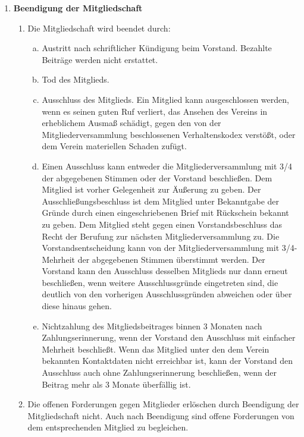 \documentclass{article}
\begin{document}
\begin{enumerate}[§ 1.]
\item \textsf{\textbf{Beendigung der Mitgliedschaft}}
	\begin{enumerate}[1.]
	\item Die Mitgliedschaft wird beendet durch:
		\begin{enumerate}[a.]
		\item Austritt nach schriftlicher Kündigung beim Vorstand. Bezahlte
Beiträge werden nicht erstattet.
		\item Tod des Mitglieds.
		\item Ausschluss des Mitglieds. Ein Mitglied kann ausgeschlossen werden, wenn es seinen guten Ruf verliert, das Ansehen des Vereins in erheblichem Ausmaß schädigt, gegen den von der Mitgliederversammlung beschlossenen Verhaltenskodex verstößt, oder dem Verein materiellen Schaden zufügt.
		\item Einen Ausschluss kann entweder die Mitgliederversammlung mit 3/4 der abgegebenen Stimmen oder  der Vorstand beschließen.
Dem Mitglied ist vorher Gelegenheit zur Äußerung zu geben.
Der Ausschließungsbeschluss ist dem Mitglied unter Bekanntgabe der Gründe durch einen eingeschriebenen Brief mit Rückschein bekannt zu geben.
Dem Mitglied steht gegen einen Vorstandsbeschluss das Recht der Berufung zur nächsten Mitgliederversammlung zu.
Die Vorstandsentscheidung kann von der Mitgliederversammlung mit 3/4-Mehrheit der abgegebenen Stimmen überstimmt werden.
Der Vorstand kann den Ausschluss desselben Mitglieds nur dann erneut beschließen, wenn weitere Ausschlussgründe eingetreten sind, die deutlich von den vorherigen Ausschlussgründen abweichen oder über diese hinaus gehen.
		\item Nichtzahlung des Mitgliedsbeitrages binnen 3 Monaten nach Zahlungserinnerung, wenn der Vorstand den Ausschluss mit einfacher Mehrheit beschließt. Wenn das Mitglied unter den dem Verein bekannten Kontaktdaten nicht erreichbar ist, kann der Vorstand den Ausschluss auch ohne Zahlungserinnerung beschließen, wenn der Beitrag mehr als 3 Monate überfällig ist.
		\end{enumerate}
	\item Die offenen Forderungen gegen Mitglieder erlöschen durch Beendigung der Mitgliedschaft nicht.
	Auch nach Beendigung sind offene Forderungen von dem entsprechenden Mitglied zu begleichen.
	\end{enumerate}
	

\end{enumerate}
\end{document}
